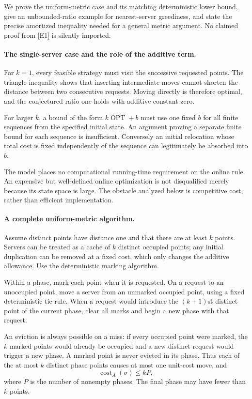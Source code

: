 \documentclass[11pt]{article}
\begin{document}
We prove the uniform-metric case and its matching deterministic lower bound, give an unbounded-ratio example for nearest-server greediness, and state the precise amortized inequality needed for a general metric argument. No claimed proof from [E1] is silently imported.

\paragraph{The single-server case and the role of the additive term.}
For $k=1$, every feasible strategy must visit the successive requested points. The triangle inequality shows that inserting intermediate moves cannot shorten the distance between two consecutive requests. Moving directly is therefore optimal, and the conjectured ratio one holds with additive constant zero.

For larger $k$, a bound of the form $k\operatorname{OPT}+b$ must use one fixed $b$ for all finite sequences from the specified initial state. An argument proving a separate finite bound for each sequence is insufficient. Conversely an initial relocation whose total cost is fixed independently of the sequence can legitimately be absorbed into $b$.

The model places no computational running-time requirement on the online rule. An expensive but well-defined online optimization is not disqualified merely because its state space is large. The obstacle analyzed below is competitive cost, rather than efficient implementation.

\paragraph{A complete uniform-metric algorithm.}
Assume distinct points have distance one and that there are at least $k$ points. Servers can be treated as a cache of $k$ distinct occupied points; any initial duplication can be removed at a fixed cost, which only changes the additive allowance. Use the deterministic marking algorithm.

Within a phase, mark each point when it is requested. On a request to an unoccupied point, move a server from an unmarked occupied point, using a fixed deterministic tie rule. When a request would introduce the $(k+1)$st distinct point of the current phase, clear all marks and begin a new phase with that request.

An eviction is always possible on a miss: if every occupied point were marked, the $k$ marked points would already be occupied and a new distinct request would trigger a new phase. A marked point is never evicted in its phase. Thus each of the at most $k$ distinct phase points causes at most one unit-cost move, and
\[
 \operatorname{cost}_A(\sigma)\le kP,
 \tag{262.1}
\]
where $P$ is the number of nonempty phases. The final phase may have fewer than $k$ points.
\end{document}
